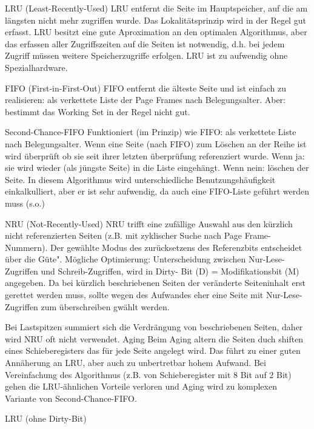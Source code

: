 \begin{answer}
LRU (Least-Recently-Used)
LRU entfernt die Seite im Hauptspeicher, auf die am längsten nicht mehr zugriffen
wurde. Das Lokalitätsprinzip wird in der Regel gut erfasst. LRU besitzt eine gute
Aproximation an den optimalen Algorithmus,
aber das erfassen aller Zugriffszeiten auf die Seiten ist notwendig, d.h. bei jedem
Zugriff müssen weitere Speicherzugriffe erfolgen. LRU ist zu aufwendig ohne Spezialhardware.

FIFO (First-in-First-Out)
FIFO entfernt die älteste Seite und ist einfach zu realisieren: als verkettete Liste der
Page Frames nach Belegungsalter.
Aber: bestimmt das Working Set in der Regel nicht gut.

Second-Chance-FIFO
Funktioniert (im Prinzip) wie FIFO: als verkettete Liste nach Belegungsalter. Wenn
eine Seite (nach FIFO) zum Löschen an der Reihe ist wird überprüft ob sie seit
ihrer letzten überprüfung referenziert wurde. Wenn ja: sie wird wieder (als jüngste
Seite) in die Liste eingehängt. Wenn nein: löschen der Seite.
In diesem Algorithmus wird unterschiedliche Benutzungshäufigkeit einkalkulliert,
aber er ist sehr aufwendig, da auch eine FIFO-Liste geführt werden muss (s.o.)

NRU (Not-Recently-Used)
NRU trifft eine zufällige Auswahl aus den kürzlich nicht referenzierten Seiten (z.B.
mit zyklischer Suche nach Page Frame-Nummern). Der gewählte Modus des zurücksetzens
des Referenzbits entscheidet über die Güte".
Mögliche Optimierung:
Unterscheidung zwischen Nur-Lese-Zugriffen und Schreib-Zugriffen, wird in Dirty-
Bit (D) = Modifikationsbit (M) angegeben.
Da bei kürzlich beschriebenen Seiten der veränderte Seiteninhalt erst gerettet werden
muss, sollte wegen des Aufwandes eher eine Seite mit Nur-Lese-Zugriffen zum
überschreiben gwählt werden.

Bei Lastspitzen summiert sich die Verdrängung von beschriebenen Seiten, daher
wird NRU oft nicht verwendet.
Aging
Beim Aging altern die Seiten duch shiften eines Schieberegisters das für jede Seite
angelegt wird. Das führt zu einer guten Annäherung an LRU, aber auch zu unbertretbar
hohem Aufwand. Bei Vereinfachung des Algorithmus (z.B. von Schieberegister
mit 8 Bit auf 2 Bit) gehen die LRU-ähnlichen Vorteile verloren und Aging wird
zu komplexen Variante von Second-Chance-FIFO.
\end{answer}

\begin{answer}
LRU (ohne Dirty-Bit)
\end{answer}

